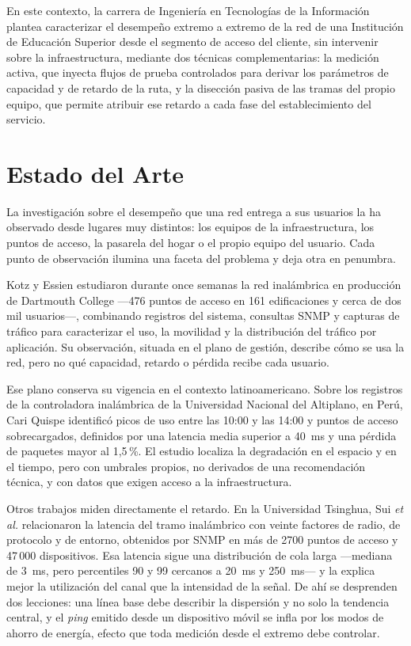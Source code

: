 En este contexto, la carrera de Ingeniería en Tecnologías de la Información plantea caracterizar el desempeño extremo a extremo de la red de una Institución de Educación Superior desde el segmento de acceso del cliente, sin intervenir sobre la infraestructura, mediante dos técnicas complementarias: la medición activa, que inyecta flujos de prueba controlados para derivar los parámetros de capacidad y de retardo de la ruta, y la disección pasiva de las tramas del propio equipo, que permite atribuir ese retardo a cada fase del establecimiento del servicio.

\section{Estado del Arte}

La investigación sobre el desempeño que una red entrega a sus usuarios la ha observado desde lugares muy distintos: los equipos de la infraestructura, los puntos de acceso, la pasarela del hogar o el propio equipo del usuario. Cada punto de observación ilumina una faceta del problema y deja otra en penumbra.

Kotz y Essien \cite{kotz2005campus} estudiaron durante once semanas la red inalámbrica en producción de Dartmouth College ---476 puntos de acceso en 161 edificaciones y cerca de dos mil usuarios---, combinando registros del sistema, consultas SNMP y capturas de tráfico para caracterizar el uso, la movilidad y la distribución del tráfico por aplicación. Su observación, situada en el plano de gestión, describe cómo se usa la red, pero no qué capacidad, retardo o pérdida recibe cada usuario.

Ese plano conserva su vigencia en el contexto latinoamericano. Sobre los registros de la controladora inalámbrica de la Universidad Nacional del Altiplano, en Perú, Cari Quispe \cite{cari2025altiplano} identificó picos de uso entre las 10:00 y las 14:00 y puntos de acceso sobrecargados, definidos por una latencia media superior a 40~ms y una pérdida de paquetes mayor al 1,5\,\%. El estudio localiza la degradación en el espacio y en el tiempo, pero con umbrales propios, no derivados de una recomendación técnica, y con datos que exigen acceso a la infraestructura.

Otros trabajos miden directamente el retardo. En la Universidad Tsinghua, Sui \textit{et al.} \cite{sui2016wifiseer} relacionaron la latencia del tramo inalámbrico con veinte factores de radio, de protocolo y de entorno, obtenidos por SNMP en más de 2700 puntos de acceso y 47\,000 dispositivos. Esa latencia sigue una distribución de cola larga ---mediana de 3~ms, pero percentiles 90 y 99 cercanos a 20~ms y 250~ms--- y la explica mejor la utilización del canal que la intensidad de la señal. De ahí se desprenden dos lecciones: una línea base debe describir la dispersión y no solo la tendencia central, y el \textit{ping} emitido desde un dispositivo móvil se infla por los modos de ahorro de energía, efecto que toda medición desde el extremo debe controlar.

